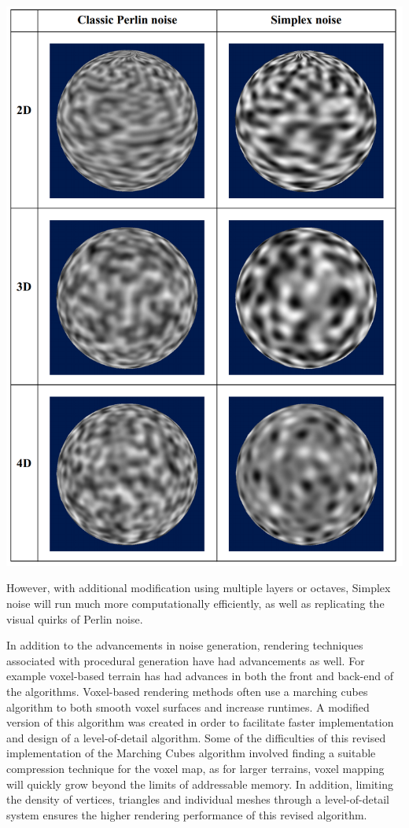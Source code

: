 \documentclass[10pt]{report}
\begin{document}
		\begin{minipage}{\textwidth}
			\centering
			\includegraphics[scale=.25]{perlin vs simplex}
			\label{fig:fig4}
		\end{minipage}
	
		However, with additional modification using multiple layers or octaves, Simplex noise will run much more computationally efficiently, as well as replicating the visual quirks of Perlin noise. 
		
		In addition to the advancements in noise generation, rendering techniques associated with procedural generation have had advancements as well. For example voxel-based terrain has had advances in both the front and back-end of the algorithms. Voxel-based rendering methods often use a marching cubes algorithm to both smooth voxel surfaces and increase runtimes. A modified version of this algorithm was created in order to facilitate faster implementation and design of a level-of-detail algorithm. Some of the difficulties of this revised implementation of the Marching Cubes algorithm involved finding a suitable compression technique for the voxel map, as for larger terrains, voxel mapping will quickly grow beyond the limits of addressable memory. In addition, limiting the density of vertices, triangles and individual meshes through a level-of-detail system ensures the higher rendering performance of this revised algorithm. 
		
\end{document}
